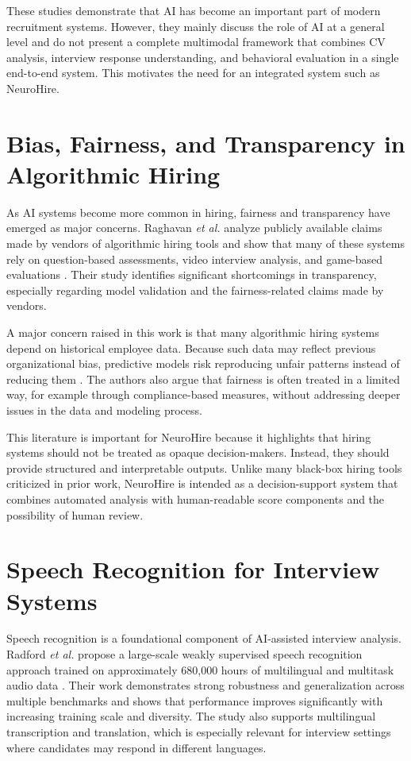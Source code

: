 These studies demonstrate that AI has become an important part of modern recruitment systems. However, they mainly discuss the role of AI at a general level and do not present a complete multimodal framework that combines CV analysis, interview response understanding, and behavioral evaluation in a single end-to-end system. This motivates the need for an integrated system such as NeuroHire.

\section{Bias, Fairness, and Transparency in Algorithmic Hiring}
As AI systems become more common in hiring, fairness and transparency have emerged as major concerns. Raghavan \textit{et al.} analyze publicly available claims made by vendors of algorithmic hiring tools and show that many of these systems rely on question-based assessments, video interview analysis, and game-based evaluations \cite{raghavan2020bias}. Their study identifies significant shortcomings in transparency, especially regarding model validation and the fairness-related claims made by vendors.

A major concern raised in this work is that many algorithmic hiring systems depend on historical employee data. Because such data may reflect previous organizational bias, predictive models risk reproducing unfair patterns instead of reducing them \cite{raghavan2020bias}. The authors also argue that fairness is often treated in a limited way, for example through compliance-based measures, without addressing deeper issues in the data and modeling process.

This literature is important for NeuroHire because it highlights that hiring systems should not be treated as opaque decision-makers. Instead, they should provide structured and interpretable outputs. Unlike many black-box hiring tools criticized in prior work, NeuroHire is intended as a decision-support system that combines automated analysis with human-readable score components and the possibility of human review.

\section{Speech Recognition for Interview Systems}
Speech recognition is a foundational component of AI-assisted interview analysis. Radford \textit{et al.} propose a large-scale weakly supervised speech recognition approach trained on approximately 680,000 hours of multilingual and multitask audio data \cite{radford2022whisper}. Their work demonstrates strong robustness and generalization across multiple benchmarks and shows that performance improves significantly with increasing training scale and diversity. The study also supports multilingual transcription and translation, which is especially relevant for interview settings where candidates may respond in different languages.

